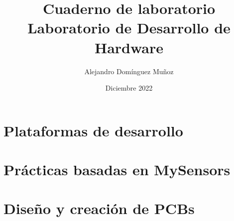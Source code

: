 \documentclass[12pt]{book}
\title{
    {Cuaderno de laboratorio}\\
    {\normalsize Laboratorio de Desarrollo de Hardware}
}
\author{Alejandro Domínguez Muñoz}
\date{Diciembre 2022}
\begin{document}
\maketitle

\tableofcontents

\part{Plataformas de desarrollo}



\part{Prácticas basadas en MySensors}



\part{Diseño y creación de PCBs}


\end{document}

